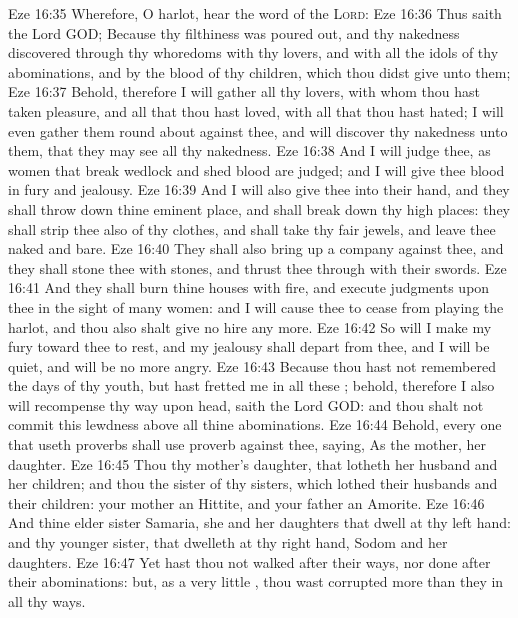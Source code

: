 \vs Eze 16:35 Wherefore, O harlot, hear the word of the \textsc{Lord}:
\vs Eze 16:36 Thus saith the Lord GOD; Because thy filthiness was poured out, and thy nakedness discovered through thy whoredoms with thy lovers, and with all the idols of thy abominations, and by the blood of thy children, which thou didst give unto them;
\vs Eze 16:37 Behold, therefore I will gather all thy lovers, with whom thou hast taken pleasure, and all  that thou hast loved, with all  that thou hast hated; I will even gather them round about against thee, and will discover thy nakedness unto them, that they may see all thy nakedness.
\vs Eze 16:38 And I will judge thee, as women that break wedlock and shed blood are judged; and I will give thee blood in fury and jealousy.
\vs Eze 16:39 And I will also give thee into their hand, and they shall throw down thine eminent place, and shall break down thy high places: they shall strip thee also of thy clothes, and shall take thy fair jewels, and leave thee naked and bare.
\vs Eze 16:40 They shall also bring up a company against thee, and they shall stone thee with stones, and thrust thee through with their swords.
\vs Eze 16:41 And they shall burn thine houses with fire, and execute judgments upon thee in the sight of many women: and I will cause thee to cease from playing the harlot, and thou also shalt give no hire any more.
\vs Eze 16:42 So will I make my fury toward thee to rest, and my jealousy shall depart from thee, and I will be quiet, and will be no more angry.
\vs Eze 16:43 Because thou hast not remembered the days of thy youth, but hast fretted me in all these ; behold, therefore I also will recompense thy way upon  head, saith the Lord GOD: and thou shalt not commit this lewdness above all thine abominations.
\vs Eze 16:44 Behold, every one that useth proverbs shall use  proverb against thee, saying, As  the mother,  her daughter.
\vs Eze 16:45 Thou  thy mother's daughter, that lotheth her husband and her children; and thou  the sister of thy sisters, which lothed their husbands and their children: your mother  an Hittite, and your father an Amorite.
\vs Eze 16:46 And thine elder sister  Samaria, she and her daughters that dwell at thy left hand: and thy younger sister, that dwelleth at thy right hand,  Sodom and her daughters.
\vs Eze 16:47 Yet hast thou not walked after their ways, nor done after their abominations: but, as  a very little , thou wast corrupted more than they in all thy ways.
